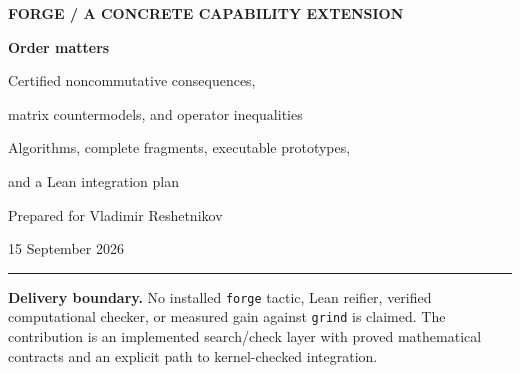 \documentclass[11pt,letterpaper]{article}
\theoremstyle{definition}\newtheorem{definition}[theorem]{Definition}
\theoremstyle{remark}\newtheorem{remark}[theorem]{Remark}
\newcommand{\code}[1]{\texttt{\small #1}}
\begin{document}
\begin{titlepage}
\vspace*{0.5in}
{\small\sffamily\bfseries\color{ink} FORGE / A CONCRETE CAPABILITY EXTENSION\par}
\vspace{0.25in}
{\Huge\bfseries\color{ink} Order matters\par}
\vspace{0.18in}
{\LARGE Certified noncommutative consequences,\par
matrix countermodels, and operator inequalities\par}
\vspace{0.35in}
{\large Algorithms, complete fragments, executable prototypes,\par
and a Lean integration plan\par}
\vspace{0.3in}
{\large Prepared for Vladimir Reshetnikov\par}
{15 September 2026\par}
\vspace{0.35in}
\begin{abstract}
Forge already proposes induction planning, witness synthesis, commutative
polynomial certificates, finite-dimensional and ideal closures, and specialized
Ore-operator transport. This report adds a different mathematical worker:
reasoning in a free associative algebra while preserving multiplication order.
Its outputs are two-sided ideal receipts, finite rational matrix countermodels,
and separate operator-positive and trace-positive certificates.

The central exact result is a finite decision procedure for consequences of
homogeneous relations. A target of degree $D$ needs only relation contexts of
total degree at most $D$; failure yields a concrete matrix model of a truncated
quotient. A second exact fragment reduces homogeneous Hermitian-square search at
arbitrary even degree to a unique rational Gram matrix. Mixed-degree and
conditional positivity use bounded ray search modulo the equality space.
A structural involution/commutation graph proposes the rays used in the CHSH
worked example automatically.

The delivered Python implementation uses only the standard library. Its
independent replay program accepts 119 stored evidence objects, including 45
matrix countermodels; 57 unit tests pass and 195 deliberately invalid mutations
are rejected. These are object-language experiments, not Lean proofs or tactic
benchmarks. The accompanying Lean reconstruction targets were not compiled.
\end{abstract}
\vfill
\hrule\medskip
\textbf{Delivery boundary.} No installed \code{forge} tactic, Lean reifier,
verified computational checker, or measured gain against \code{grind} is
claimed. The contribution is an implemented search/check layer with proved
mathematical contracts and an explicit path to kernel-checked integration.
\end{titlepage}
{\small\setlength{\parskip}{0pt}\tableofcontents}
\newpage






\end{document}
